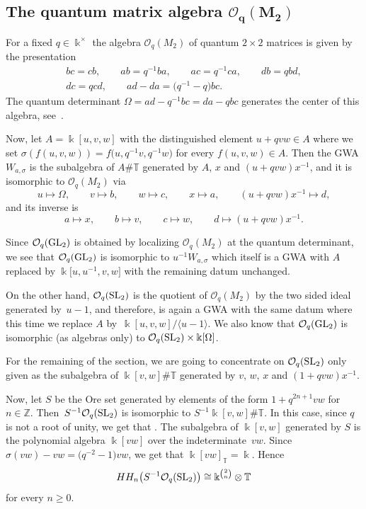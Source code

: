 \documentclass[pdftex]{sigma}
\newcommand{\C}[1]{\mathcal{#1}}
\newcommand{\B}[1]{\mathbb{#1}}
\newcommand{\CH}{{\rm CH}}
\renewcommand{\geq}{\geqslant}
\numberwithin{equation}{section}
\begin{document}
\subsection[The quantum matrix algebra CO\_q(M\_2)]{The quantum matrix algebra $\boldsymbol{\C{O}_q(M_2)}$}

For a fixed $q\in\Bbbk^\times$ the algebra $\C{O}_q(M_2)$ of quantum $2\times 2$ matrices
is given by the presentation
\begin{gather*}
 bc = cb,\qquad
 ab = q^{-1}ba,\qquad
 ac = q^{-1}ca,\qquad
 db = qbd,\\
 dc = qcd,\qquad
 ad-da = \bigl(q^{-1}-q\bigr)bc.
\end{gather*}
The quantum determinant
$\Omega = ad - q^{-1}bc = da - qbc$ generates the center of this algebra,
see~\cite[pp.~4--8]{BrownGoodearl:QuantumGroups}.

Now, let $A = \Bbbk[u,v,w]$ with the distinguished element $u + q vw\in A$ where we set
$\sigma(f(u,v,w))\allowbreak=f\bigl(u,q^{-1}v,q^{-1}w\bigr)$ for every $f(u,v,w)\in A$. Then the GWA
$W_{a,\sigma}$ is the subalgebra of $A\# \B{T}$ generated by $A$, $x$ and
$(u + qvw)x^{-1}$, and it is isomorphic to $\C{O}_q(M_2)$ via
\[ u\mapsto\Omega,\qquad
 v\mapsto b,\qquad
 w\mapsto c,\qquad
 x\mapsto a,\qquad
 (u+qvw) x^{-1}\mapsto d,
\]
and its inverse is
\[ a\mapsto x,\qquad
 b\mapsto v,\qquad
 c\mapsto w,\qquad
 d\mapsto (u+qvw)x^{-1}.
\]

Since $\C{O}_q({\rm GL}_2)$ is obtained by localizing $\C{O}_q(M_2)$ at the quantum determinant, we see
that $\C{O}_q({\rm GL}_2)$ is isomorphic to $u^{-1}W_{a,\sigma}$ which itself is a GWA with $A$ replaced
by $\Bbbk\big[u,u^{-1},v,w\big]$ with the remaining datum unchanged.

On the other hand, $\C{O}_q({\rm SL}_2)$ is the quotient of $\C{O}_q(M_2)$ by the two sided
ideal generated by~$u-1$, and therefore, is again a GWA with the same datum where this
time we replace $A$ by~$\Bbbk[u,v,w]/\langle u-1\rangle$. We also know that
$\C{O}_q({\rm GL}_2)$ is isomorphic (as algebras only) to $\C{O}_q({\rm SL}_2)\times \Bbbk[\Omega]$.

For the remaining of the section, we are going to concentrate on $\C{O}_q({\rm SL}_2)$ only given
as the subalgebra of $\Bbbk[v,w]\# \B{T}$ generated by $v$, $w$, $x$ and
$(1+qvw)x^{-1}$.

Now, let $S$ be the Ore set generated by elements of the form $1+q^{2n+1}vw$ for $n\in\B{Z}$. Then~$S^{-1}\C{O}_q({\rm SL}_2)$ is isomorphic to $S^{-1}\Bbbk[v,w]\# \B{T}$. In this case, since $q$ is not a
root of unity, we get that
\smash{$\CH_*\bigl(A,S^{-1}A\bigr)^{\B{T}}=\CH_*(\Bbbk) = \CH_*(A)_{\B{T}}$}. The subalgebra of $\Bbbk[v,w]$
generated by $S$ is the polynomial algebra $\Bbbk[vw]$ over the indeterminate~$vw$. Since
$\sigma(vw)-vw=\bigl(q^{-2}-1\bigr)vw$, we get that $\Bbbk[vw]_{\B{T}} = \Bbbk$. Hence
\[
 HH_n\bigl(S^{-1}\C{O}_q({\rm SL}_2)\bigr) \cong \Bbbk^{\binom{2}{n}}\otimes\B{T}
\] for every $n\geq 0$.
\end{document}
